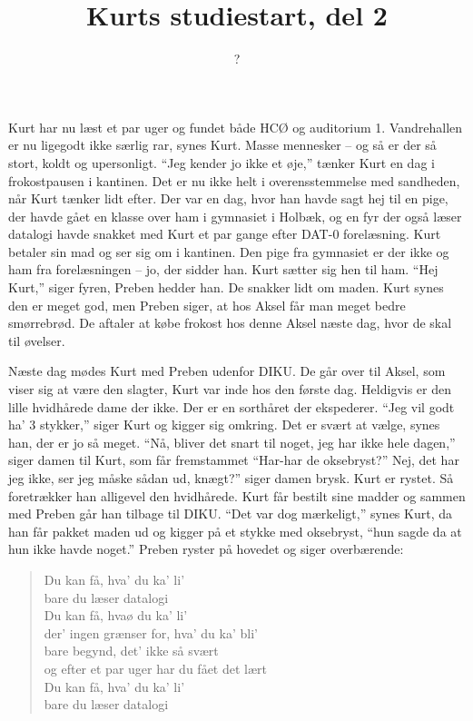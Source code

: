 \documentclass[a4paper,11pt]{article}
\title{Kurts studiestart, del 2}
\author{?}
\begin{document}
\maketitle

\begin{sketch}

Kurt har nu læst et par uger og fundet både HCØ og auditorium 1. Vandrehallen er nu ligegodt ikke særlig rar, synes Kurt. Masse mennesker -- og så er der så stort, koldt og upersonligt. ``Jeg kender jo ikke et øje,'' tænker Kurt en dag i frokostpausen i kantinen. Det er nu ikke helt i overensstemmelse med sandheden, når Kurt tænker lidt efter. Der var en dag, hvor han havde sagt hej til en pige, der havde gået en klasse over ham i gymnasiet i Holbæk, og en fyr der også læser datalogi havde snakket med Kurt et par gange efter DAT-0 forelæsning. Kurt betaler sin mad og ser sig om i kantinen. Den pige fra gymnasiet er der ikke og ham fra forelæsningen -- jo, der sidder han. Kurt sætter sig hen til ham. ``Hej Kurt,'' siger fyren, Preben hedder han. De snakker lidt om maden. Kurt synes den er meget god, men Preben siger, at hos Aksel får man meget bedre smørrebrød. De aftaler at købe frokost hos denne Aksel næste dag, hvor de skal til øvelser.

Næste dag mødes Kurt med Preben udenfor DIKU. De går over til Aksel, som viser sig at være den slagter, Kurt var inde hos den første dag. Heldigvis er den lille hvidhårede dame der ikke. Der er en sorthåret der ekspederer. ``Jeg vil godt ha' 3 stykker,'' siger Kurt og kigger sig omkring. Det er svært at vælge, synes han, der er jo så meget. ``Nå, bliver det snart til noget, jeg har ikke hele dagen,'' siger damen til Kurt, som får fremstammet ``Har-har de oksebryst?'' Nej, det har jeg ikke, ser jeg måske sådan ud, knægt?'' siger damen brysk. Kurt er rystet. Så foretrækker han alligevel den hvidhårede. Kurt får bestilt sine madder og sammen med Preben går han tilbage til DIKU. ``Det var dog mærkeligt,'' synes Kurt, da han får pakket maden ud og kigger på et stykke med oksebryst, ``hun sagde da at hun ikke havde noget.'' Preben ryster på hovedet og siger overbærende:

\begin{quote}
    Du kan få, hva' du ka' li' \\
    bare du læser datalogi \\
    Du kan få, hvaø du ka' li' \\
    der' ingen grænser for, hva' du ka' bli' \\
    bare begynd, det' ikke så svært \\
    og efter et par uger har du fået det lært \\
    Du kan få, hva' du ka' li' \\
    bare du læser datalogi 
\end{quote}

\end{sketch}
\end{document}
